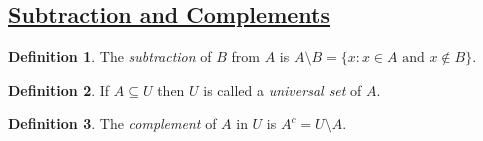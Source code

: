 \documentclass{amsart} %
\theoremstyle{definition} %
\newtheorem*{dfn}{Definition} %
\theoremstyle{proposition} %
\theoremstyle{remark} %
\begin{document}
\subsection{\underline{Subtraction and Complements}}

\begin{dfn}
\boxed{\setminus} \quad The \emph{subtraction} of $B$ from $A$ is $A \setminus B = \{x: x \in A \text{ and } x \not\in B \}$. %
\end{dfn}

\begin{dfn}
 \quad If $A \subseteq U$ then $U$ is called a \emph{universal set} of $A$.
\end{dfn}

\begin{dfn}
 \quad The \emph{complement} of $A$ in $U$ is $A^c = U \setminus A$.
\end{dfn}
\end{document}
